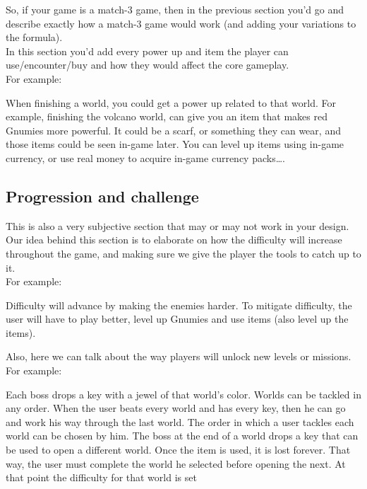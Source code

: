 \documentclass[12pt, a4paper]{article}
\begin{document}
So, if your game is a match-3 game, then in the previous section you’d go and describe exactly how a match-3 game would work (and adding your variations to the formula).\\

In this section you’d add every power up and item the player can use/encounter/buy and how they would affect the core gameplay.\\

For example:
\begin{tcolorbox}
When finishing a world, you could get a power up related to that world. For example, finishing the volcano world, can give you an item that makes red Gnumies more powerful. It could be a scarf, 
or something they can wear, and those items could be seen in-game later. You can level up items using in-game currency, or use real money to acquire in-game currency packs…. 
\end{tcolorbox}

\subsection{Progression and challenge}
This is also a very subjective section that may or may not work in your design. Our idea behind this section is to elaborate on how the difficulty will increase throughout the game, and making sure we give the player the tools to catch up to it.\\

For example:
\begin{tcolorbox}
Difficulty will advance by making the enemies harder. 
To mitigate difficulty, the user will have to play better, 
level up Gnumies and use items (also level up the items).
\end{tcolorbox}
Also, here we can talk about the way players will unlock new levels or missions.\\

For example:
\begin{tcolorbox}
Each boss drops a key with a jewel of that world’s color. Worlds can be tackled in any order. When the user beats every world and has every key, then he can go and work his way through the last world. The order in which a user tackles each world can be chosen by him. The boss at the end of a world drops a key that can be used to open a different world. Once the item is used, it is lost forever. 
That way, the user must complete the world he selected before opening the next. At that point the difficulty for that world is set
\end{tcolorbox}
\end{document}
